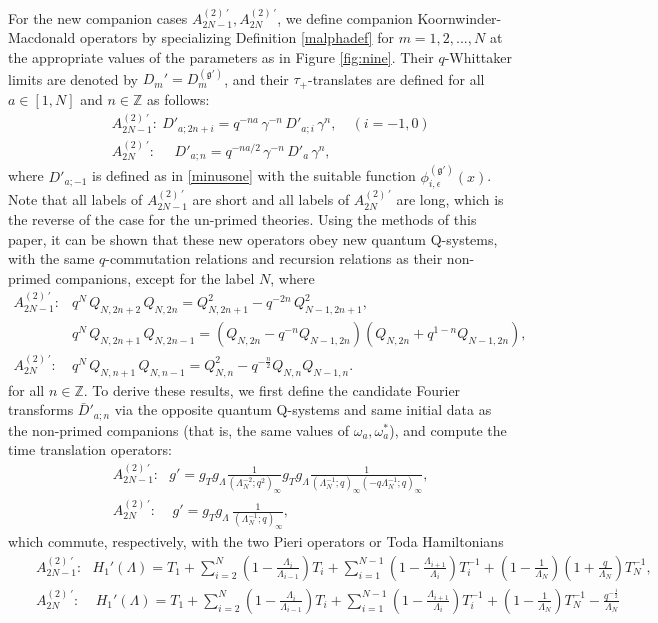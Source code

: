 \documentclass[12pt]{amsart}
\newcommand{\g}{{\mathfrak{g}}}
\newcommand{\Z}{{\mathbb Z}}
\newcommand{\lL}{{\Lambda}}
\newcommand{\half}{\frac{1}{2}}
\numberwithin{equation}{section}
\begin{document}
For the new companion cases $A_{2N-1}^{(2)\,'},A_{2N}^{(2)\,'}$, we define
companion Koornwinder-Macdonald operators by specializing Definition \ref{malphadef} for $m=1,2,...,N$ at the appropriate values of the parameters as in Figure \ref{fig:nine}. Their  $q$-Whittaker limits are denoted by $D_{m}'=D_{m}^{(\g')}$, and their $\tau_+$-translates are defined for all $a\in[1,N]$
and $n\in \Z$ as follows:
\begin{eqnarray*}
&&A_{2N-1}^{(2)\,'}:\ D'_{a;2n+i}=q^{-na}\,\gamma^{-n}\, D'_{a;i} \, \gamma^n, \quad (i=-1,0)\\
&&A_{2N}^{(2)\,'}:\ \ \ \ \ \ D'_{a;n}=q^{-na/2}\,\gamma^{-n}\, D'_{a} \, \gamma^n,
\end{eqnarray*}
where $D'_{a;-1}$ is defined as in \eqref{minusone} with the suitable function $\phi^{(\g')}_{i,\epsilon}(x)$. Note that all labels of $A_{2N-1}^{(2)\,'}$
are short and all labels of $A_{2N}^{(2)\,'}$ are long, which is the reverse of the case for the un-primed theories.
Using the methods of this paper, it can be shown that these new operators obey new quantum Q-systems, with the same $q$-commutation relations and recursion relations as their non-primed companions, except for the label $N$, where
$$
\renewcommand{\arraystretch}{1.5}
\begin{array}{rl}
A_{2N-1}^{(2)\,'}:&  q^N\,  Q_{N,2n+2}\,Q_{N,2n}=Q_{N,2n+1}^2-q^{-2n} \,Q_{N-1,2n+1}^2,\\
& q^N\,  Q_{N,2n+1}\,Q_{N,2n-1}=(Q_{N,2n}-q^{-n} Q_{N-1,2n})(Q_{N,2n}+q^{1-n} Q_{N-1,2n}),\\
A_{2N}^{(2)\,'}:& q^N\,  Q_{N,n+1}\,Q_{N,n-1}=Q_{N,n}^2-q^{-\frac{n}{2}} Q_{N,n}Q_{N-1,n} .
\end{array}
$$
for all $n\in \Z$. To derive these results, we first define the
candidate Fourier transforms $\bar D'_{a;n}$ via the 
opposite quantum Q-systems and same initial 
data as the non-primed companions (that is, the same values of $\omega_a,\omega_a^*$), and compute the time translation operators:
\begin{eqnarray*}
&&A_{2N-1}^{(2)\,'}:\ \ \ g'= g_T g_\lL \frac{1}{(\lL_N^{-2};q^2)_\infty}
g_T g_\lL \frac{1}{(\lL_N^{-1};q)_\infty(-q\lL_N^{-1};q)_\infty},\\
&&A_{2N}^{(2)\,'}:\ \ \ \ \ g'= g_T g_\lL \, \frac{1}{(\lL_N^{-1};q)_\infty},
\end{eqnarray*}
which commute, respectively, with the two Pieri operators or Toda Hamiltonians
\begin{eqnarray*}
&&A_{2N-1}^{(2)\,'}:\ \ \ H_1'(\lL)=T_1+\sum_{i=2}^N {\scriptstyle \left(1-\frac{\lL_i}{\lL_{i-1}}\right)}T_i+\sum_{i=1}^{N-1}{\scriptstyle \left(1-\frac{\lL_{i+1}}{\lL_{i}}\right)} T_i^{-1} 
+{\scriptstyle \left(1-\frac{1}{\lL_{N}}\right)\left(1+\frac{q}{\lL_{N}}\right)} T_N^{-1}, \\
&&A_{2N}^{(2)\,'}:\ \ \ \ \ H_1'(\lL)=T_1+\sum_{i=2}^N {\scriptstyle \left(1-\frac{\lL_i}{\lL_{i-1}}\right)}T_i+\sum_{i=1}^{N-1}
{\scriptstyle \left(1-\frac{\lL_{i+1}}{\lL_{i}}\right)}T_i^{-1}+{\scriptstyle \left(1-\frac{1}{\lL_{N}}\right)}T_N^{-1} -{\scriptstyle \frac{q^{-\half}}{\lL_N}}
\end{eqnarray*}
\end{document}
